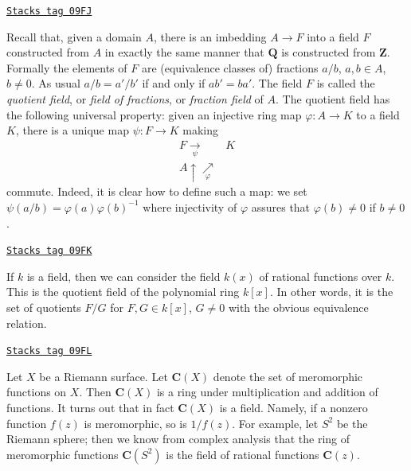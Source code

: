 \begin{example}

\label{fields-example-quotient-field}
\href{https://stacks.math.columbia.edu/tag/09FJ}{\texttt{Stacks tag 09FJ}}

Recall that, given a domain $A$, there is an imbedding $A \to F$ into a
field $F$ constructed from $A$ in exactly the same manner that
$\mathbf{Q}$ is constructed from $\mathbf{Z}$. Formally the elements
of $F$ are (equivalence classes of) fractions $a/b$,
$a, b \in A$, $b \not = 0$. As usual $a/b = a'/b'$ if and only if $ab' = ba'$.
The field $F$ is called the {\it quotient field}, or {\it field of fractions},
or {\it fraction field} of $A$.
The quotient field has the following universal property: given an
injective ring map $\varphi : A \to K$ to a field $K$, there is a unique
map $\psi : F \to K$ making
$$
\begin{array}{cc}F \underset{\psi}{\longrightarrow} & K \\ A \uparrow\underset{\varphi}{\nearrow} & \end{array}
$$
commute. Indeed, it is clear how to define such a map: we set
$\psi(a/b) = \varphi(a)\varphi(b)^{-1}$ where injectivity of $\varphi$
assures that $\varphi(b) \not = 0$ if $ b \not = 0$.
\end{example}

\begin{example}

\label{fields-example-field-of-rational-functions}
\href{https://stacks.math.columbia.edu/tag/09FK}{\texttt{Stacks tag 09FK}}

If $k$ is a field, then we can consider the field $k(x)$ of rational
functions over $k$. This is the quotient field of the polynomial ring
$k[x]$. In other words, it is the set of quotients $F/G$ for
$F, G \in k[x]$, $G \not = 0$ with the obvious equivalence relation.
\end{example}

\begin{example}
\label{fields-example-field-of-meromorphic-functions}
\href{https://stacks.math.columbia.edu/tag/09FL}{\texttt{Stacks tag 09FL}}

Let $X$ be a Riemann surface. Let $\mathbf{C}(X)$ denote the
set of meromorphic functions on $X$. Then $\mathbf{C}(X)$ is a ring under
multiplication and addition of functions. It turns out that in fact
$\mathbf{C}(X)$ is a field. Namely, if a nonzero function $f(z)$ is
meromorphic, so is $1/f(z)$. For example, let $S^2$ be the Riemann
sphere; then we know from complex analysis that the ring of meromorphic
functions $\mathbf{C}(S^2)$ is the field of rational functions $\mathbf{C}(z)$.
\end{example}

